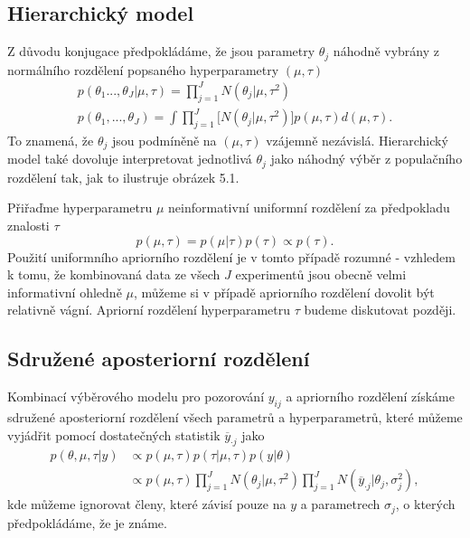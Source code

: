 \subsection{Hierarchický model}

Z důvodu konjugace předpokládáme, že jsou parametry $\theta_j$ náhodně vybrány z normálního rozdělení popsaného hyperparametry $(\mu, \tau)$
\begin{equation}
\begin{split}
p(\theta_1 ..., \theta_J | \mu, \tau) = \prod_{j = 1}^J N(\theta_j | \mu, \tau^2)\\
p(\theta_1, ..., \theta_J) = \int \prod_{j = 1}^J \big[N(\theta_j | \mu, \tau^2)\big]p(\mu, \tau)d(\mu, \tau).
\end{split}
\end{equation}
To znamená, že $\theta_j$ jsou podmíněně na $(\mu, \tau)$ vzájemně nezávislá. Hierarchický model také dovoluje interpretovat jednotlivá $\theta_j$ jako náhodný výběr z populačního rozdělení tak, jak to ilustruje obrázek 5.1.

Přiřaďme hyperparametru $\mu$ neinformativní uniformní rozdělení za předpokladu znalosti $\tau$
\begin{equation}
p(\mu, \tau) = p(\mu | \tau) p(\tau) \varpropto p(\tau).
\end{equation}
Použití uniformního apriorního rozdělení je v tomto případě rozumné - vzhledem k tomu, že kombinovaná data ze všech $J$ experimentů jsou obecně velmi informativní ohledně $\mu$, můžeme si v případě apriorního rozdělení dovolit být relativně vágní. Apriorní rozdělení hyperparametru $\tau$ budeme diskutovat později.

\subsection{Sdružené aposteriorní rozdělení}

Kombinací výběrového modelu pro pozorování $y_{ij}$ a apriorního rozdělení získáme sdružené aposteriorní rozdělení všech parametrů a hyperparametrů, které můžeme vyjádřit pomocí dostatečných statistik $\overline{y}_{\cdot j}$ jako
\begin{equation}
\begin{split}
p(\theta, \mu, \tau | y) & \varpropto p(\mu, \tau) p(\tau | \mu, \tau) p(y | \theta)\\
 & \varpropto p(\mu, \tau) \prod_{j = 1}^J N(\theta_j | \mu, \tau^2) \prod_{j = 1}^J N(\overline{y}_{\cdot j} | \theta_j, \sigma_j^2),
\end{split}
\end{equation}
kde můžeme ignorovat členy, které závisí pouze na $y$ a parametrech $\sigma_j$, o kterých předpokládáme, že je známe.

